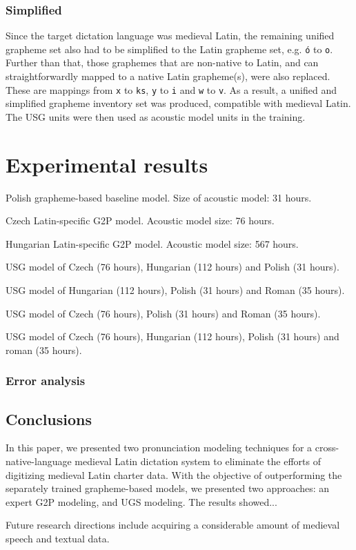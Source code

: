 \documentclass[runningheads,a4paper]{llncs}
\begin{document}
\subsubsection{Simplified}\label{simplified}
Since the target dictation language was medieval Latin, the remaining unified grapheme set also had to be simplified to the Latin grapheme set, e.g. \texttt{\'{o}} to \texttt{o}.
Further than that, those graphemes that are non-native to Latin, and can straightforwardly mapped to a native Latin grapheme(s), were also replaced.
These are mappings from \texttt{x} to \texttt{ks}, \texttt{y} to \texttt{i} and \texttt{w} to \texttt{v}.
As a result, a unified and simplified grapheme inventory set was produced, compatible with medieval Latin.
The USG units were then used as acoustic model units in the training.
\section{Experimental results}\label{results}
\begin{table}
\parbox{.45\linewidth}{
\centering
\caption{Polish grapheme-based baseline model. Size of acoustic model: 31 hours.}

}
\hfill
\parbox{.45\linewidth}{
\centering
\caption{Czech Latin-specific G2P model. Acoustic model size: 76 hours.}

}
\hfill
\parbox{.45\linewidth}{
\centering
\caption{Hungarian Latin-specific G2P model. Acoustic model size: 567 hours.}

}
\hfill
\parbox{.45\linewidth}{
\centering
\caption{USG model of Czech (76 hours), Hungarian (112 hours) and Polish (31 hours).}

}
\hfill
\parbox{.45\linewidth}{
\centering
\caption{USG model of Hungarian (112 hours), Polish (31 hours) and Roman (35 hours).}

}
\hfill
\parbox{.45\linewidth}{
\centering
\caption{USG model of Czech (76 hours), Polish (31 hours) and Roman (35 hours).}

}
\hfill
\parbox{.45\linewidth}{
\centering
\caption{USG model of Czech (76 hours), Hungarian (112 hours), Polish (31 hours) and roman (35 hours).}

}
\end{table}
\subsubsection{Error analysis}
\subsection{Conclusions}
In this paper, we presented two pronunciation modeling techniques for a cross-native-language medieval Latin dictation system to eliminate the efforts of digitizing medieval Latin charter data.
With the objective of outperforming the separately trained grapheme-based models, we presented two approaches: an expert G2P modeling, and UGS modeling.
The results showed...

Future research directions include acquiring a considerable amount of medieval speech and textual data.



\end{document}
